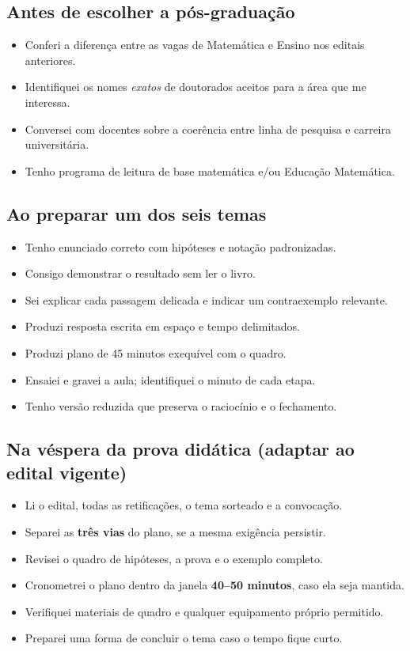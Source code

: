 \documentclass[11pt,a4paper]{article}
\begin{document}
\subsection{Antes de escolher a pós-graduação}
\begin{itemize}[label=$\square$]
\item Conferi a diferença entre as vagas de Matemática e Ensino nos editais anteriores.
\item Identifiquei os nomes \emph{exatos} de doutorados aceitos para a área que me interessa.
\item Conversei com docentes sobre a coerência entre linha de pesquisa e carreira universitária.
\item Tenho programa de leitura de base matemática e/ou Educação Matemática.
\end{itemize}

\subsection{Ao preparar um dos seis temas}
\begin{itemize}[label=$\square$]
\item Tenho enunciado correto com hipóteses e notação padronizadas.
\item Consigo demonstrar o resultado sem ler o livro.
\item Sei explicar cada passagem delicada e indicar um contraexemplo relevante.
\item Produzi resposta escrita em espaço e tempo delimitados.
\item Produzi plano de 45 minutos exequível com o quadro.
\item Ensaiei e gravei a aula; identifiquei o minuto de cada etapa.
\item Tenho versão reduzida que preserva o raciocínio e o fechamento.
\end{itemize}

\subsection{Na véspera da prova didática (adaptar ao edital vigente)}
\begin{itemize}[label=$\square$]
\item Li o edital, todas as retificações, o tema sorteado e a convocação.
\item Separei as \textbf{três vias} do plano, se a mesma exigência persistir.
\item Revisei o quadro de hipóteses, a prova e o exemplo completo.
\item Cronometrei o plano dentro da janela \textbf{40--50 minutos}, caso ela seja mantida.
\item Verifiquei materiais de quadro e qualquer equipamento próprio permitido.
\item Preparei uma forma de concluir o tema caso o tempo fique curto.
\end{itemize}
\end{document}
